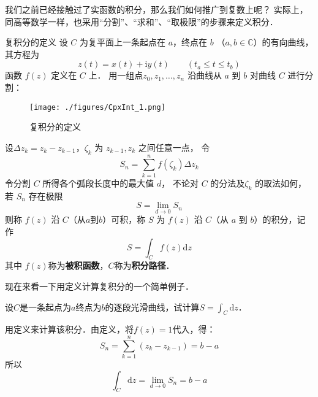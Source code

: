 
\begin{issues}
\end{issues}



我们之前已经接触过了实函数的积分，那么我们如何推广到复数上呢？ 实际上，同高等数学一样，也采用“分割”、“求和”、“取极限”的步骤来定义积分．
\begin{definition}{复积分的定义}
设 $C$ 为复平面上一条起点在 $a$，终点在 $b$ （$a,b\in\mathbb C$）的有向曲线， 其方程为
\begin{equation}
z(t)=x(t)+\mathrm{i} y(t) \qquad(t_a \leqslant t \leqslant t_b)
\end{equation}
函数 $f(z)$ 定义在 $C$ 上． 用一组点$z_{0}, z_{1}, \dots, z_{n}$ 沿曲线从 $a$ 到 $b$ 对曲线 $C$ 进行分割：
\begin{figure}[ht]
\centering
\texttt{[image: ./figures/CpxInt\_1.png]}
\caption{复积分的定义} \label{CpxInt_fig1}
\end{figure}
设$\Delta z_{k}=z_{k}-z_{k-1}$，$\zeta_k$ 为 $z_{k-1},z_k$ 之间任意一点， 令
\begin{equation}
\displaystyle S_{n}=\sum_{k=1}^{n} f\left(\zeta_{k}\right) \Delta z_{k}
\end{equation}
令分割 $C$ 所得各个弧段长度中的最大值 $d$， 不论对 $C$ 的分法及$\zeta_k$ 的取法如何， 若 $S_n$ 存在极限
\begin{equation}
S=\lim_{d \rightarrow 0} S_{n}
\end{equation}
则称 $f(z)$ 沿 $C $（从$a$到$b$）可积，称 $S$ 为 $f(z)$ 沿 $C$（从 $a$ 到 $b$）的积分，记作
\begin{equation}
S=\int_{C} f(z) \mathrm{d} z
\end{equation}
其中 $f (z)$称为\textbf{被积函数}，$C$称为\textbf{积分路径}．
\end{definition}

现在来看一下用定义计算复积分的一个简单例子．
\begin{example}{}
设$C $是一条起点为$a $终点为$b $的逐段光滑曲线，试计算$\displaystyle S=\int_C\mathrm dz$．

用定义来计算该积分．由定义，将$f(z)=1$代入，得：
\begin{equation}
S_{n}=\sum_{k=1}^{n}\left(z_{k}-z_{k-1}\right)=b-a
\end{equation}
所以
\begin{equation}
\int_{C} \mathrm{d} z=\lim _{d \rightarrow 0} S_{n}=b-a
\end{equation}
\end{example}

